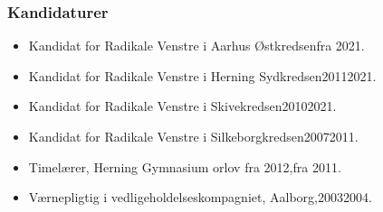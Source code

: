 \documentclass[11pt, a4paper]{awesome-cv}
\begin{document}
\begin{cvletter}
\subsubsection*{Kandidaturer}
\begin{itemize}
\item Kandidat for Radikale Venstre i Aarhus Østkredsenfra 2021.
\item Kandidat for Radikale Venstre i Herning Sydkredsen20112021.
\item Kandidat for Radikale Venstre i Skivekredsen20102021.
\item Kandidat for Radikale Venstre i Silkeborgkredsen20072011.
\end{itemize}
\begin{itemize}
\item Timelærer, Herning Gymnasium orlov fra 2012,fra 2011.
\item Værnepligtig i vedligeholdelseskompagniet, Aalborg,20032004.
\end{itemize}
\end{cvletter}
\end{document}
